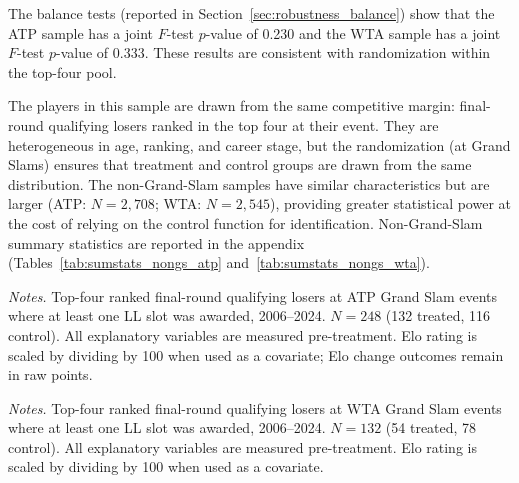 The balance tests (reported in Section~\ref{sec:robustness_balance}) show that the ATP sample has a joint $F$-test $p$-value of 0.230 and the WTA sample has a joint $F$-test $p$-value of 0.333. These results are consistent with randomization within the top-four pool.

The players in this sample are drawn from the same competitive margin: final-round qualifying losers ranked in the top four at their event. They are heterogeneous in age, ranking, and career stage, but the randomization (at Grand Slams) ensures that treatment and control groups are drawn from the same distribution. The non-Grand-Slam samples have similar characteristics but are larger (ATP: $N = 2{,}708$; WTA: $N = 2{,}545$), providing greater statistical power at the cost of relying on the control function for identification. Non-Grand-Slam summary statistics are reported in the appendix (Tables~\ref{tab:sumstats_nongs_atp} and~\ref{tab:sumstats_nongs_wta}).

\begin{table}[htbp]
\centering
\caption{Summary Statistics: ATP Grand Slam Sample}
\label{tab:sumstats_gs_atp}
\begin{threeparttable}
\small

\begin{tablenotes}
\footnotesize
\item \textit{Notes.} Top-four ranked final-round qualifying losers at ATP Grand Slam events where at least one LL slot was awarded, 2006--2024. $N = 248$ (132 treated, 116 control). All explanatory variables are measured pre-treatment. Elo rating is scaled by dividing by 100 when used as a covariate; Elo change outcomes remain in raw points.
\end{tablenotes}
\end{threeparttable}
\end{table}

\begin{table}[htbp]
\centering
\caption{Summary Statistics: WTA Grand Slam Sample}
\label{tab:sumstats_gs_wta}
\begin{threeparttable}
\small

\begin{tablenotes}
\footnotesize
\item \textit{Notes.} Top-four ranked final-round qualifying losers at WTA Grand Slam events where at least one LL slot was awarded, 2006--2024. $N = 132$ (54 treated, 78 control). All explanatory variables are measured pre-treatment. Elo rating is scaled by dividing by 100 when used as a covariate.
\end{tablenotes}
\end{threeparttable}
\end{table}
